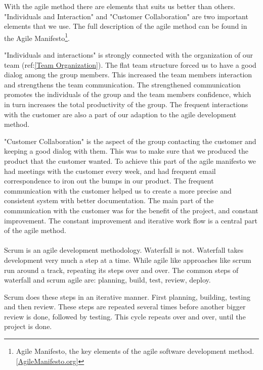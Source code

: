     With the agile method there are elements that suits us better than others. "Individuals and Interaction" and "Customer Collaboration" are two important elements that we use. The full description of the agile method can be found in the Agile Manifesto\footnote
        {Agile Manifesto, the key elements of the agile software development method. [\href{http://http://agilemanifesto.org/}{AgileManifesto.org}]}.
    
    "Individuals and interactions" is strongly connected with the organization of our team (ref:\ref{Team Organization}). The flat team structure forced us to have a good dialog among the group members. This increased the team members interaction and strengthens the team communication. The strengthened communication promotes the individuals of the group and the team members confidence, which in turn increases the total productivity of the group. The frequent interactions with the customer are also a part of our adaption to the agile development method. 
    
    "Customer Collaboration" is the aspect of the group contacting the customer and keeping a good dialog with them. This was to make sure that we produced the product that the customer wanted. To achieve this part of the agile manifesto we had meetings with the customer every week, and had frequent email correspondence to iron out the bumps in our product. The frequent communication with the customer helped us to create a more precise and consistent system with better documentation. The main part of the communication with the customer was for the benefit of the project, and constant improvement. The constant improvement and iterative work flow is a central part of the agile method. 
    \\\\
    Scrum is an agile development methodology. Waterfall is not. Waterfall takes development very much a step at a time. While agile like approaches like scrum run around a track, repeating its steps over and over. The common steps of waterfall and scrum agile are: planning, build, test, review, deploy. 
               
    Scrum does these steps in an iterative manner. First planning, building, testing and then review. These steps are repeated several times before another bigger review is done, followed by testing. This cycle repeats over and over, until the project is done. 
    
